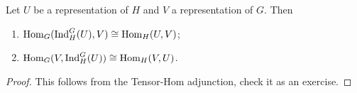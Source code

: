 \begin{corollary}
  Let $U$ be a representation of
  $H$ and $V$ a representation of $G$. Then
  \begin{enumerate}
    \item $\operatorname{Hom}_G(\operatorname{Ind}_H^G(U), V) \cong \operatorname{Hom}_H(U, V)$;
    \item $\operatorname{Hom}_G(V, \operatorname{Ind}_H^G(U)) \cong \operatorname{Hom}_H(V, U)$.
  \end{enumerate}
\end{corollary}

\begin{proof}
  This follows from the Tensor-Hom
  adjunction, check it as an exercise.
\end{proof}
